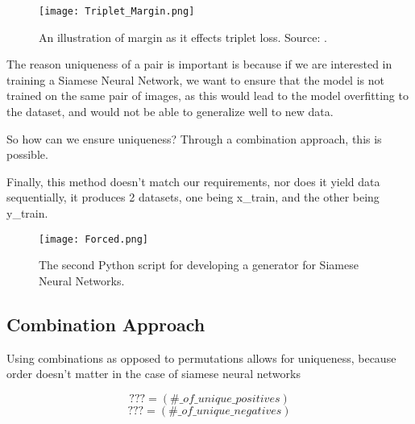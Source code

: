 \documentclass[
	letterpaper, %
	10pt, %
	unnumberedsections, %
	twoside, %
]{LTJournalArticle}
\begin{document}
\begin{figure} %
	\texttt{[image: Triplet\_Margin.png]}
	\caption{An illustration of margin as it effects triplet loss. Source: \autocite{yusuf_sar}.}
	\label{fig:triplet_margin}
\end{figure}

The reason uniqueness of a pair is important is because if we are interested in training a Siamese Neural Network, we want to ensure that the model is not trained on the same pair of images, as this would lead to the model overfitting to the dataset, and would not be able to generalize well to new data.

So how can we ensure uniqueness? Through a combination approach, this is possible.

Finally, this method doesn't match our requirements, nor does it yield data sequentially, it produces 2 datasets, one being x\_train, and the other being y\_train.

\begin{figure*}[hbt!] %
	\centering
    \texttt{[image: Forced.png]}
	\caption{The second Python script for developing a generator for Siamese Neural Networks.}
	\label{fig:forced}
\end{figure*}

\subsection{Combination Approach}

Using combinations as opposed to permutations allows for uniqueness, because order doesn't matter in the case of siamese neural networks

\[ ??? = (\#\_of\_unique\_positives) \]
\[ ??? = (\#\_of\_unique\_negatives) \]
\end{document}
